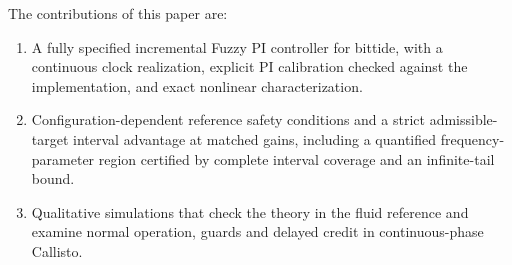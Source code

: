 The contributions of this paper are:
\begin{enumerate}
  \item A fully specified incremental Fuzzy PI controller for bittide,
  with a continuous clock realization, explicit PI calibration checked
  against the implementation, and exact nonlinear characterization.
  \item Configuration-dependent reference safety conditions and a strict
  admissible-target interval advantage at matched gains, including a
  quantified frequency-parameter region certified by complete interval
  coverage and an infinite-tail bound.
  \item Qualitative simulations that check the theory in the fluid reference
  and examine normal operation, guards and delayed credit in
  continuous-phase Callisto.
\end{enumerate}



